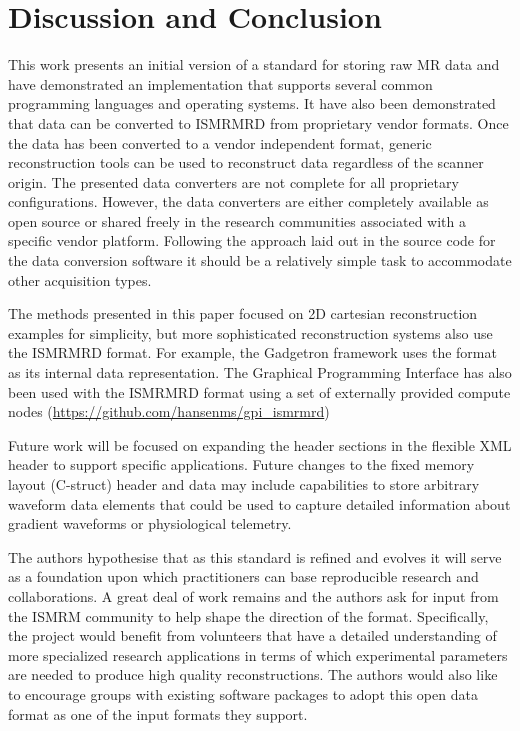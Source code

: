 \documentclass[12pt]{article}
\begin{document}
\section*{Discussion and Conclusion}
This work presents an initial version of a standard for storing raw MR data and have demonstrated an implementation that supports several common programming languages and operating systems. It have also been demonstrated that data can be converted to ISMRMRD from proprietary vendor formats. Once the data has been converted to a vendor independent format, generic reconstruction tools can be used to reconstruct data regardless of the scanner origin. The presented data converters are not complete for all proprietary configurations. However, the data converters are either completely available as open source or shared freely in the research communities associated with a specific vendor platform. Following the approach laid out in the source code for the data conversion software it should be a relatively simple task to accommodate other acquisition types. 

The methods presented in this paper focused on 2D cartesian reconstruction examples for simplicity, but more sophisticated reconstruction systems also use the ISMRMRD format. For example, the Gadgetron \cite{Hansen:2013aa} framework uses the format as its internal data representation. The Graphical Programming Interface \cite{Zwart:2014aa} has also been used with the ISMRMRD format using a set of externally provided compute nodes (\url{https://github.com/hansenms/gpi_ismrmrd})

Future work will be focused on expanding the header sections in the flexible XML header to support specific applications.  Future changes to the fixed memory layout (C-struct) header and data may include capabilities to store arbitrary waveform data elements that could be used to capture detailed information about gradient waveforms or physiological telemetry. 

The authors hypothesise that as this standard is refined and evolves it will serve as a foundation upon which practitioners can base reproducible research and collaborations.  A great deal of work remains and the authors ask for input from the ISMRM community to help shape the direction of the format. Specifically, the project would benefit from volunteers that have a detailed understanding of more specialized research applications in terms of which experimental parameters are needed to produce high quality reconstructions. The authors would also like to encourage groups with existing software packages to adopt this open data format as one of the input formats they support. 
\end{document}
